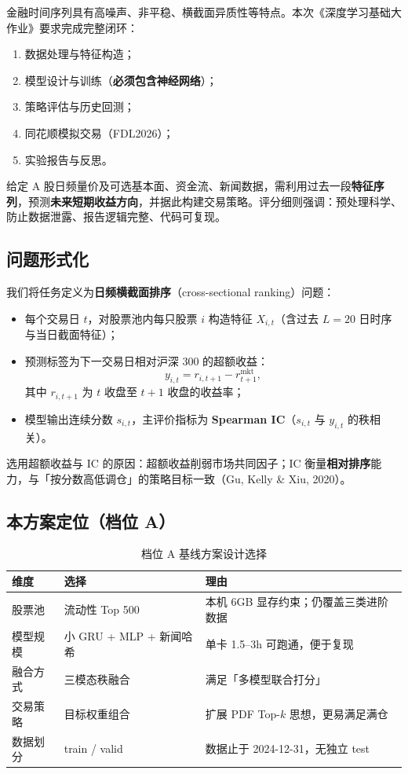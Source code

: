 \documentclass[UTF8,a4paper,12pt]{ctexart}
\begin{document}
金融时间序列具有高噪声、非平稳、横截面异质性等特点。本次《深度学习基础大作业》要求完成完整闭环：
\begin{enumerate}[leftmargin=2em]
  \item 数据处理与特征构造；
  \item 模型设计与训练（\textbf{必须包含神经网络}）；
  \item 策略评估与历史回测；
  \item 同花顺模拟交易（FDL2026）；
  \item 实验报告与反思。
\end{enumerate}

给定 A 股日频量价及可选基本面、资金流、新闻数据，需利用过去一段\textbf{特征序列}，预测\textbf{未来短期收益方向}，并据此构建交易策略。评分细则强调：预处理科学、防止数据泄露、报告逻辑完整、代码可复现。

\subsection{问题形式化}

我们将任务定义为\textbf{日频横截面排序}（cross-sectional ranking）问题：
\begin{itemize}[leftmargin=2em]
  \item 每个交易日 $t$，对股票池内每只股票 $i$ 构造特征 $X_{i,t}$（含过去 $L=20$ 日时序与当日截面特征）；
  \item 预测标签为下一交易日相对沪深 300 的超额收益：
  \begin{equation}
    y_{i,t} = r_{i,t+1} - r^{\mathrm{mkt}}_{t+1},
  \end{equation}
  其中 $r_{i,t+1}$ 为 $t$ 收盘至 $t+1$ 收盘的收益率；
  \item 模型输出连续分数 $s_{i,t}$，主评价指标为 \textbf{Spearman IC}（$s_{i,t}$ 与 $y_{i,t}$ 的秩相关）。
\end{itemize}

选用超额收益与 IC 的原因：超额收益削弱市场共同因子；IC 衡量\textbf{相对排序}能力，与「按分数高低调仓」的策略目标一致（Gu, Kelly \& Xiu, 2020）。

\subsection{本方案定位（档位 A）}

\begin{table}[H]
\centering
\caption{档位 A 基线方案设计选择}
\label{tab:design}
\begin{tabular}{lll}
\toprule
\textbf{维度} & \textbf{选择} & \textbf{理由} \\
\midrule
股票池   & 流动性 Top 500       & 本机 6GB 显存约束；仍覆盖三类进阶数据 \\
模型规模 & 小 GRU + MLP + 新闻哈希 & 单卡 1.5--3h 可跑通，便于复现 \\
融合方式 & 三模态秩融合         & 满足「多模型联合打分」 \\
交易策略 & 目标权重组合         & 扩展 PDF Top-$k$ 思想，更易满足满仓 \\
数据划分 & train / valid        & 数据止于 2024-12-31，无独立 test \\
\bottomrule
\end{tabular}
\end{table}
\end{document}

